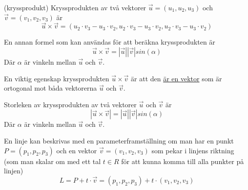 \documentclass[../main.tex]{subfiles}
\begin{document}
\begin{formel}{(kryssprodukt)}
\label{kryssprod} 
Kryssprodukten av två vektorer $\vec{u} = (u_1, u_2, u_3)$ och $\vec{v} = (v_1, v_2, v_3)$ är
\[\vec{u}\times \vec{v} = (u_2\cdot v_3 - u_3\cdot v_2, u_2\cdot v_3 - u_3\cdot v_2, u_2\cdot v_3 - u_3\cdot v_2)\]

En annan formel som kan användas för att beräkna kryssprodukten är
\[\vec{u}\times \vec{v} = |\vec{u}||\vec{v}|sin(\alpha)\]
Där $\alpha$ är vinkeln mellan $\vec{u}$ och $\vec{v}$.

En viktig egenskap kryssprodukten $\vec{u}\times\vec{v}$ är att den \underline{är en vektor} som är ortogonal mot båda vektorerna $\vec{u}$ och $\vec{v}$.
\end{formel}


\begin{formel}
\label{kryssprodsize} 
Storleken av kryssprodukten av två vektorer $\vec{u}$ och $\vec{v}$ är
\[|\vec{u}\times \vec{v}| = |\vec{u}||\vec{v}|sin(\alpha)\]
Där $\alpha$ är vinkeln mellan $\vec{u}$ och $\vec{v}$.
\end{formel}


\begin{formel}
\label{parameterlinje} 
En linje kan beskrivas med en parameterframställning om man har en punkt $P = (p_1, p_2, p_3)$ och en vektor $\vec{v}=(v_1, v_2, v_3)$ som pekar i linjens riktning (som man skalar om med ett tal $t \in R$ för att kunna komma till alla punkter på linjen)
\[L = P + t \cdot \vec{v} = (p_1, p_2, p_3) + t\cdot (v_1, v_2, v_3)\]
\end{formel}
\end{document}
